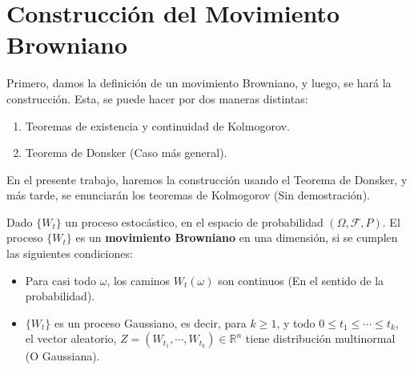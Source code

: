 \section{Construcción del Movimiento Browniano}

Primero, damos la definición de un movimiento Browniano, y luego, se hará la construcción. Esta, se puede hacer por dos maneras distintas:

\begin{enumerate}
	\item Teoremas de existencia y continuidad de Kolmogorov.
	\item Teorema de Donsker (Caso más general).
\end{enumerate}

En el presente trabajo, haremos la construcción usando el Teorema de Donsker, y más tarde, se enunciarán los teoremas de Kolmogorov (Sin demostración).

\begin{boxDef}
	Dado $\{ W_t \}$ un proceso estocástico, en el espacio de probabilidad $(\Omega, \mathcal{F}, P)$. El proceso $\{ W_t \}$ es un \textbf{movimiento Browniano} en una dimensión, si se cumplen las siguientes condiciones:

	\begin{itemize}
		\item Para casi todo $\omega$, los caminos $W_t (\omega)$ son continuos (En el sentido de la probabilidad).
		\item $\{ W_t \}$ es un proceso Gaussiano, es decir, para $k \geq 1$, y todo $0 \leq t_1 \leq \cdots \leq t_k$, el vector aleatorio, $Z = (W_{t_1}, \cdots, W_{t_k}) \in \mathbb{R}^{n}$ tiene distribución multinormal (O Gaussiana).
	\end{itemize}

\end{boxDef}
